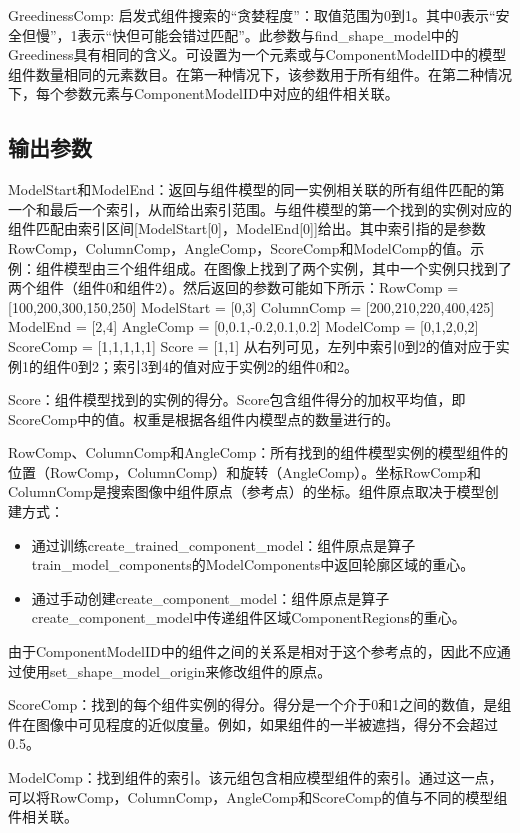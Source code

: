 \documentclass{article}
\begin{document}
GreedinessComp: 启发式组件搜索的“贪婪程度”：取值范围为0到1。其中0表示“安全但慢”，1表示“快但可能会错过匹配”。此参数与find\_shape\_model中的Greediness具有相同的含义。可设置为一个元素或与ComponentModelID中的模型组件数量相同的元素数目。在第一种情况下，该参数用于所有组件。在第二种情况下，每个参数元素与ComponentModelID中对应的组件相关联。

\subsection{输出参数}
ModelStart和ModelEnd：返回与组件模型的同一实例相关联的所有组件匹配的第一个和最后一个索引，从而给出索引范围。与组件模型的第一个找到的实例对应的组件匹配由索引区间[ModelStart[0]，ModelEnd[0]]给出。其中索引指的是参数RowComp，ColumnComp，AngleComp，ScoreComp和ModelComp的值。示例：组件模型由三个组件组成。在图像上找到了两个实例，其中一个实例只找到了两个组件（组件0和组件2）。然后返回的参数可能如下所示：RowComp = [100,200,300,150,250] ModelStart = [0,3] ColumnComp = [200,210,220,400,425] ModelEnd = [2,4] AngleComp = [0,0.1,-0.2,0.1,0.2] ModelComp = [0,1,2,0,2] ScoreComp = [1,1,1,1,1] Score = [1,1] 从右列可见，左列中索引0到2的值对应于实例1的组件0到2；索引3到4的值对应于实例2的组件0和2。

Score：组件模型找到的实例的得分。Score包含组件得分的加权平均值，即ScoreComp中的值。权重是根据各组件内模型点的数量进行的。

RowComp、ColumnComp和AngleComp：所有找到的组件模型实例的模型组件的位置（RowComp，ColumnComp）和旋转（AngleComp）。坐标RowComp和ColumnComp是搜索图像中组件原点（参考点）的坐标。组件原点取决于模型创建方式：

\begin{itemize}
  \item 通过训练create\_trained\_component\_model：组件原点是算子 train\_model\_components的ModelComponents中返回轮廓区域的重心。

  \item 通过手动创建create\_component\_model：组件原点是算子 create\_component\_model中传递组件区域ComponentRegions的重心。
\end{itemize}

由于ComponentModelID中的组件之间的关系是相对于这个参考点的，因此不应通过使用set\_shape\_model\_origin来修改组件的原点。

ScoreComp：找到的每个组件实例的得分。得分是一个介于0和1之间的数值，是组件在图像中可见程度的近似度量。例如，如果组件的一半被遮挡，得分不会超过0.5。

ModelComp：找到组件的索引。该元组包含相应模型组件的索引。通过这一点，可以将RowComp，ColumnComp，AngleComp和ScoreComp的值与不同的模型组件相关联。
\end{document}
